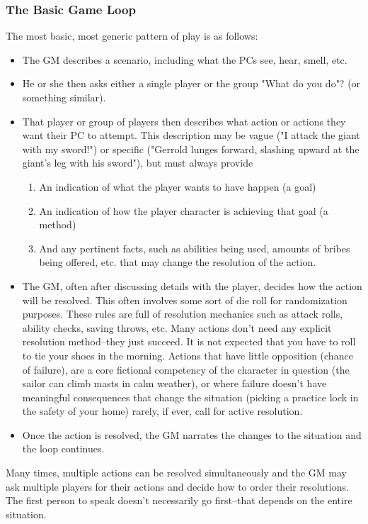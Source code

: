 \subsubsection{The Basic Game Loop}
The most basic, most generic pattern of play is as follows:
\begin{itemize}
    \item The GM describes a scenario, including what the PCs see, hear, smell, etc.
    \item He or she then asks either a single player or the group "What do you do"? (or something similar).
    \item That player or group of players then describes what action or actions they want their PC to attempt. This description may be vague ("I attack the giant with my sword!") or specific ("Gerrold lunges forward, slashing upward at the giant's leg with his sword"), but must always provide
    \begin{enumerate}
        \item An indication of what the player wants to have happen (a goal)
        \item An indication of how the player character is achieving that goal (a method)
        \item And any pertinent facts, such as abilities being used, amounts of bribes being offered, etc. that may change the resolution of the action.
    \end{enumerate}
    \item The GM, often after discussing details with the player, decides how the action will be resolved. This often involves some sort of die roll for randomization purposes. These rules are full of resolution mechanics such as attack rolls, ability checks, saving throws, etc. Many actions don't need any explicit resolution method--they just succeed. It is not expected that you have to roll to tie your shoes in the morning. Actions that have little opposition (chance of failure), are a core fictional competency of the character in question (the sailor can climb masts in calm weather), or where failure doesn't have meaningful consequences that change the situation (picking a practice lock in the safety of your home) rarely, if ever, call for active resolution.
    \item Once the action is resolved, the GM narrates the changes to the situation and the loop continues.
\end{itemize}

Many times, multiple actions can be resolved simultaneously and the GM may ask multiple players for their actions and decide how to order their resolutions. The first person to speak doesn't necessarily go first--that depends on the entire situation.

